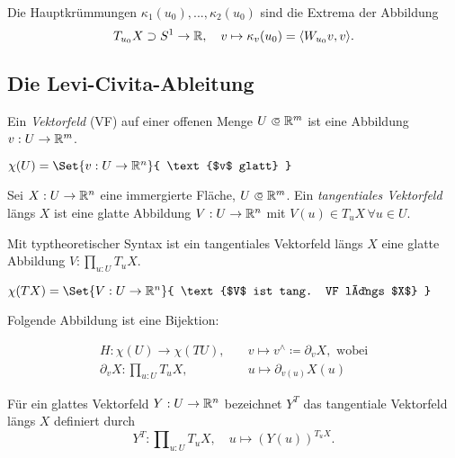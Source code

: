 \documentclass{cheat-sheet}
\let\myProd\prod
\DeclareMathOperator*{\textprod}{{\textstyle \myProd}}
\renewcommand{\prod}{\textprod}
\newcommand\opn{\mathrel{\ooalign{$\subset$\cr
  \hidewidth\raise.1ex\hbox{$\circ\mkern.5mu$}\cr}}}
\begin{document}
\begin{satz}
  Die Hauptkrümmungen $\kappa_1(u_0), ..., \kappa_2(u_0)$ sind die Extrema der Abbildung
  \[ T_{u_0} X \supset S^1 \to \mathbb{R}, \quad v \mapsto \kappa_v(u_0) = \langle W_{u_0} v, v \rangle. \]
\end{satz}


\subsection{Die Levi-Civita-Ableitung}

\begin{defn}
  Ein \emph{Vektorfeld} (VF) auf einer offenen Menge $U \opn \R^m$ ist eine Abbildung $v : U \to \mathbb{R}^m$.
\end{defn}

\begin{nota}
  $\chi(U) = \Set{ v : U \to \R^n }{ \text{$v$ glatt} }$
\end{nota}

\begin{defn}
  Sei $X : U \to \mathbb{R}^n$ eine immergierte Fläche, $U \opn \R^m$. Ein \emph{tangentiales Vektorfeld} längs $X$ ist eine glatte Abbildung $V : U \to \mathbb{R}^n$ mit $V(u) \in T_u X \, \forall u \in U$.
\end{defn}

\begin{defn}
  Mit typtheoretischer Syntax ist ein tangentiales Vektorfeld längs $X$ eine glatte Abbildung $V : \prod_{u : U} T_u X$.
\end{defn}

\begin{nota}
  $\chi(TX) = \Set{ V : U \to \R^n }{ \text{$V$ ist tang. VF längs $X$} }$
\end{nota}

\begin{bem}
  Folgende Abbildung ist eine Bijektion:

  \begin{align*}
     H : \chi(U) \to \chi(TU), \quad &v \mapsto v^{\wedge} \coloneqq \partial_v X, \text{ wobei}\\
     \partial_v X : \prod_{u : U} T_u X, \quad &u \mapsto \partial_{v(u)} X(u)
   \end{align*} 
\end{bem}

\begin{nota}
  Für ein glattes Vektorfeld $Y : U \to \mathbb{R}^n$ bezeichnet $Y^T$ das tangentiale Vektorfeld längs $X$ definiert durch
  \[ Y^T : \prod_{u : U} T_u X, \quad u \mapsto (Y(u))^{T_u X}. \]
\end{nota}
\end{document}

